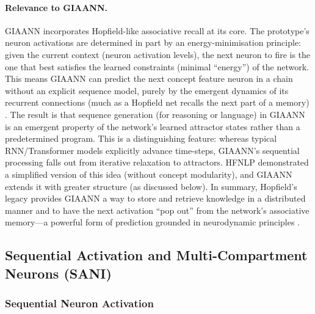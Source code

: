 \paragraph{Relevance to GIAANN.}
GIAANN incorporates Hopfield-like associative recall at its core.
The prototype’s neuron activations are determined in part by an energy-minimisation principle: given the current context (neuron activation levels), the next neuron to fire is the one that best satisfies the learned constraints (minimal ``energy'') of the network.
This means GIAANN can predict the next concept feature neuron in a chain without an explicit sequence model, purely by the emergent dynamics of its recurrent connections (much as a Hopfield net recalls the next part of a memory) \citep{hopfield1982neural}.
The result is that sequence generation (for reasoning or language) in GIAANN is an emergent property of the network’s learned attractor states rather than a predetermined program.
This is a distinguishing feature: whereas typical RNN/Transformer models explicitly advance time-steps, GIAANN’s sequential processing falls out from iterative relaxation to attractors.
HFNLP demonstrated a simplified version of this idea (without concept modularity), and GIAANN extends it with greater structure (as discussed below).
In summary, Hopfield’s legacy provides GIAANN a way to store and retrieve knowledge in a distributed manner and to have the next activation ``pop out'' from the network’s associative memory---a powerful form of prediction grounded in neurodynamic principles \citep{hopfield1982neural,amit1985spinGlassNeuralNetworks}.

\subsection{Sequential Activation and Multi-Compartment Neurons (SANI)}

\subsubsection{Sequential Neuron Activation}

